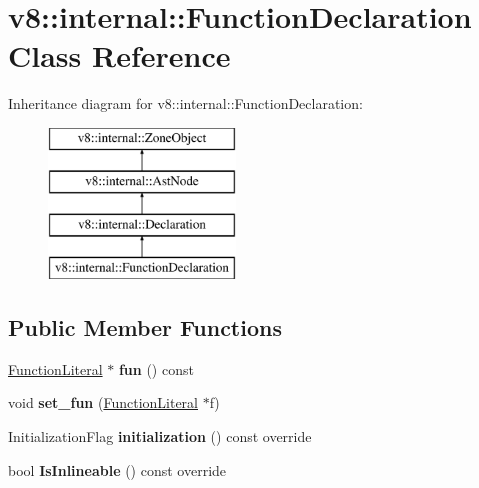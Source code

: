 \hypertarget{classv8_1_1internal_1_1_function_declaration}{}\section{v8\+:\+:internal\+:\+:Function\+Declaration Class Reference}
\label{classv8_1_1internal_1_1_function_declaration}
Inheritance diagram for v8\+:\+:internal\+:\+:Function\+Declaration\+:\begin{figure}[H]
\begin{center}
\leavevmode
\includegraphics[height=4.000000cm]{classv8_1_1internal_1_1_function_declaration}
\end{center}
\end{figure}
\subsection*{Public Member Functions}
\begin{DoxyCompactItemize}
\item 
\hyperlink{classv8_1_1internal_1_1_function_literal}{Function\+Literal} $\ast$ {\bfseries fun} () const \hypertarget{classv8_1_1internal_1_1_function_declaration_a84b3d46538068bd759727d1d7373c7b5}{}\label{classv8_1_1internal_1_1_function_declaration_a84b3d46538068bd759727d1d7373c7b5}

\item 
void {\bfseries set\+\_\+fun} (\hyperlink{classv8_1_1internal_1_1_function_literal}{Function\+Literal} $\ast$f)\hypertarget{classv8_1_1internal_1_1_function_declaration_a39c54d09c9900509337201b71711a664}{}\label{classv8_1_1internal_1_1_function_declaration_a39c54d09c9900509337201b71711a664}

\item 
Initialization\+Flag {\bfseries initialization} () const  override\hypertarget{classv8_1_1internal_1_1_function_declaration_a519d12596f4ae7fc5cc7916f4e3e69a5}{}\label{classv8_1_1internal_1_1_function_declaration_a519d12596f4ae7fc5cc7916f4e3e69a5}

\item 
bool {\bfseries Is\+Inlineable} () const  override\hypertarget{classv8_1_1internal_1_1_function_declaration_a5fae3679739ed48e4f5af293f25f59a0}{}\label{classv8_1_1internal_1_1_function_declaration_a5fae3679739ed48e4f5af293f25f59a0}

\end{DoxyCompactItemize}
